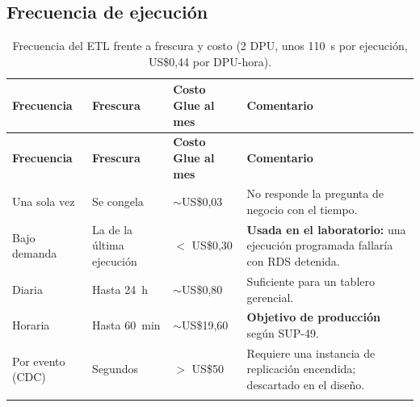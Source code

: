 \documentclass[10pt,letterpaper]{article}
\begin{document}
\subsection{Frecuencia de ejecución}
\begin{longtable}{@{}L{3.0cm} L{3.4cm} L{3.0cm} L{6.2cm}@{}}
\toprule \textbf{Frecuencia} & \textbf{Frescura} & \textbf{Costo Glue al mes} & \textbf{Comentario} \\ \midrule \endfirsthead
\toprule \textbf{Frecuencia} & \textbf{Frescura} & \textbf{Costo Glue al mes} & \textbf{Comentario} \\ \midrule \endhead
Una sola vez & Se congela & $\sim$US\$0,03 & No responde la pregunta de negocio con el tiempo. \\
Bajo demanda & La de la última ejecución & $<$ US\$0,30 & \textbf{Usada en el laboratorio:} una ejecución programada fallaría con RDS detenida. \\
Diaria & Hasta 24~h & $\sim$US\$0,80 & Suficiente para un tablero gerencial. \\
Horaria & Hasta 60~min & $\sim$US\$19,60 & \textbf{Objetivo de producción} según SUP-49. \\
Por evento (CDC) & Segundos & $>$ US\$50 & Requiere una instancia de replicación encendida; descartado en el diseño. \\
\bottomrule
\caption{Frecuencia del ETL frente a frescura y costo (2 DPU, unos 110~s por ejecución, US\$0,44 por DPU-hora).}
\end{longtable}
\end{document}
